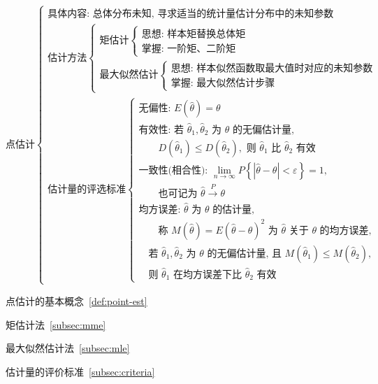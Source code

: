 ﻿\documentclass[lang=cn,11pt]{elegantbook}
\begin{document}
{\small
\[
\text{点估计}
\begin{cases}
\text{具体内容: 总体分布未知, 寻求适当的统计量估计分布中的未知参数} \\
\text{估计方法}
\begin{cases}
\text{矩估计}
\begin{cases}
\text{思想: 样本矩替换总体矩} \\
\text{掌握: 一阶矩、二阶矩}
\end{cases} \\
\text{最大似然估计}
\begin{cases}
\text{思想: 样本似然函数取最大值时对应的未知参数} \\
\text{掌握: 最大似然估计步骤}
\end{cases}
\end{cases} \\
\text{估计量的评选标准}
\begin{cases}
\text{无偏性: } E(\hat{\theta}) = \theta \\
\text{有效性: 若 } \hat{\theta}_1,\hat{\theta}_2 \text{ 为 } \theta \text{ 的无偏估计量,} \\
\qquad D(\hat{\theta}_1) \leq D(\hat{\theta}_2), \text{ 则 } \hat{\theta}_1 \text{ 比 } \hat{\theta}_2 \text{ 有效} \\
\text{一致性(相合性): } \lim\limits_{n \to \infty} P\left\{|\hat{\theta} - \theta| < \varepsilon\right\} = 1, \\
\qquad \text{也可记为 } \hat{\theta} \xrightarrow{P} \theta \\
\text{均方误差: } \hat{\theta} \text{ 为 } \theta \text{ 的估计量,} \\
\qquad \text{称 } M(\hat{\theta}) = E(\hat{\theta} - \theta)^2 \text{ 为 } \hat{\theta} \text{ 关于 } \theta \text{ 的均方误差}, \\
\quad \text{若 } \hat{\theta}_1,\hat{\theta}_2 \text{ 为 } \theta \text{ 的无偏估计量, 且 } M(\hat{\theta}_1) \leq M(\hat{\theta}_2), \\
\quad \text{则 } \hat{\theta}_1 \text{ 在均方误差下比 } \hat{\theta}_2 \text{ 有效}
\end{cases}
\end{cases}
\]
}

\begin{introduction}
    \item 点估计的基本概念~\ref{def:point-est}
    \item 矩估计法~\ref{subsec:mme}
    \item 最大似然估计法~\ref{subsec:mle}
    \item 估计量的评价标准~\ref{subsec:criteria}
\end{introduction}
\end{document}
